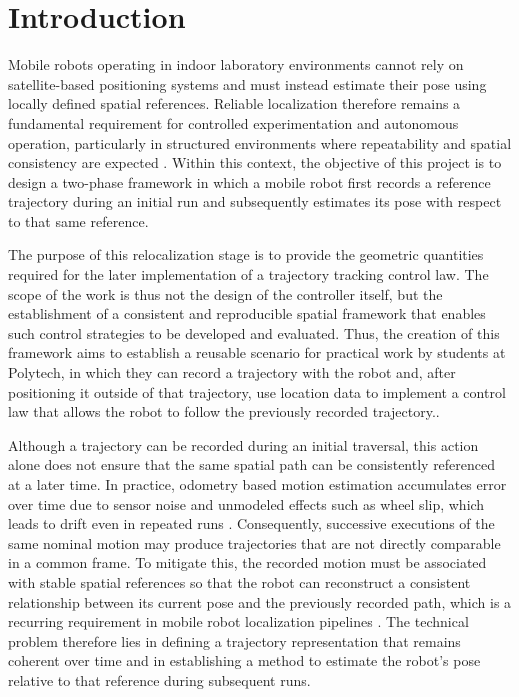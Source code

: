 \documentclass[a4paper,11pt]{article}
\begin{document}
\newpage
\section{Introduction}

	Mobile robots operating in indoor laboratory environments cannot rely on satellite-based positioning systems and must instead estimate their pose using locally defined spatial references. Reliable localization therefore remains a fundamental requirement for controlled experimentation and autonomous operation, particularly in structured environments where repeatability and spatial consistency are expected \cite{ULLAH2024100651}. Within this context, the objective of this project is to design a two-phase framework in which a mobile robot first records a reference trajectory during an initial run and subsequently estimates its pose with respect to that same reference. 
	
	The purpose of this relocalization stage is to provide the geometric quantities required for the later implementation of a trajectory tracking control law. The scope of the work is thus not the design of the controller itself, but the establishment of a consistent and reproducible spatial framework that enables such control strategies to be developed and evaluated. Thus, the creation of this framework aims to establish a reusable scenario for practical work by students at Polytech, in which they can record a trajectory with the robot and, after positioning it outside of that trajectory, use location data to implement a control law that allows the robot to follow the previously recorded trajectory..
	
	Although a trajectory can be recorded during an initial traversal, this action alone does not ensure that the same spatial path can be consistently referenced at a later time. In practice, odometry based motion estimation accumulates error over time due to sensor noise and unmodeled effects such as wheel slip, which leads to drift even in repeated runs \cite{elhoushi2019odometry_survey}. Consequently, successive executions of the same nominal motion may produce trajectories that are not directly comparable in a common frame. To mitigate this, the recorded motion must be associated with stable spatial references so that the robot can reconstruct a consistent relationship between its current pose and the previously recorded path, which is a recurring requirement in mobile robot localization pipelines \cite{ULLAH2024100651}. The technical problem therefore lies in defining a trajectory representation that remains coherent over time and in establishing a method to estimate the robot’s pose relative to that reference during subsequent runs.
	
\end{document}
